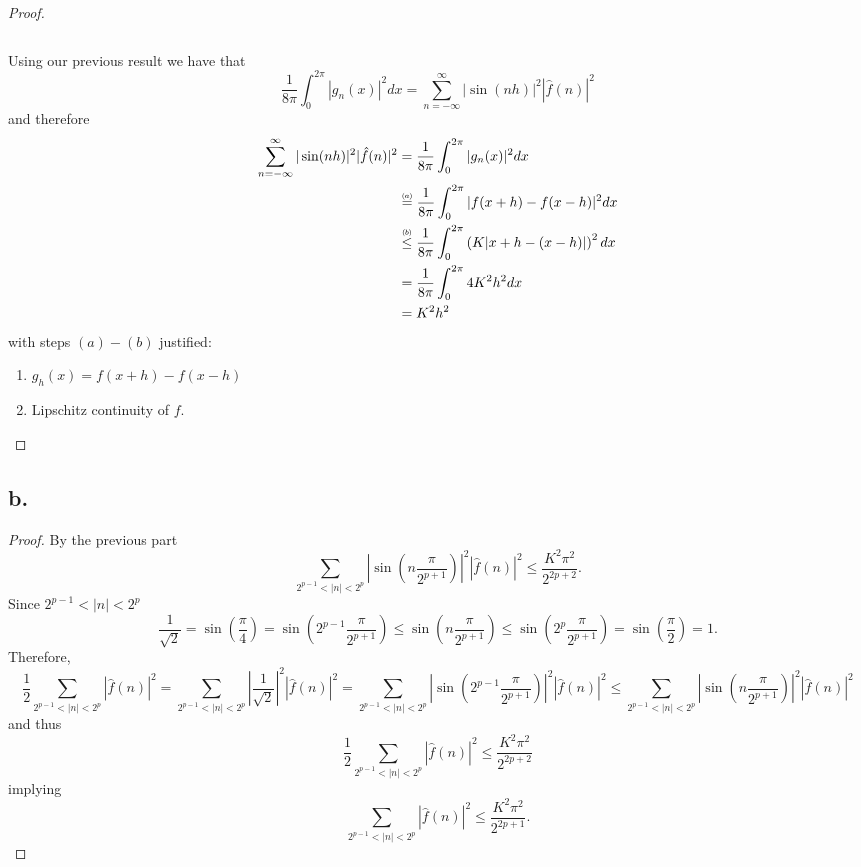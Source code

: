 \documentclass{article}
\newcommand\numeq[1]%
  {\stackrel{\scriptscriptstyle(\mkern-1.5mu#1\mkern-1.5mu)}{=}}
\newcommand\numleq[1]
  {\stackrel{\scriptscriptstyle(\mkern-1.5mu#1\mkern-1.5mu)}{\leq}}
\begin{document}
\begin{proof}
\begin{enumerate}[\indent(a)]
\[   \]
\end{enumerate}
Using our previous result we have that 
\[
 \frac{1}{8\pi}\int_0^{2\pi}|g_n(x)|^2dx = \sum\limits_{n = -\infty}^{\infty}|\sin(nh)|^2|\hat{f}(n)|^2   
\]
and therefore
\begin{align*}
    \sum\limits_{n = -\infty}^{\infty}|\sin(nh)|^2|\hat{f}(n)|^2 &= \frac{1}{8\pi}\int_0^{2\pi}|g_n(x)|^2dx \\
    &\numeq{a} \frac{1}{8\pi}\int_0^{2\pi}|f(x + h) - f(x - h)|^2dx \\
    &\numleq{b}\frac{1}{8 \pi}\int_0^{2\pi}\left(K|x + h - (x -h)|\right)^2 dx \\
    &= \frac{1}{8 \pi}\int_0^{2 \pi} 4K^2h^2dx \\
    &= K^2h^2
\end{align*}
with steps $(a)-(b)$ justified: 
\begin{enumerate}[\indent(a)]
   \item $g_h(x) = f(x + h)- f(x -h)$
   \item Lipschitz continuity of $f$.  
\end{enumerate}
\end{proof}
\subsection*{b.}
\begin{proof}
    By the previous part
    \[
    \sum\limits_{2^{p-1} < |n| < 2^p} \left|\sin\left(n\frac{\pi}{2^{p + 1}}\right)\right|^2|\hat{f}(n)|^2 \leq  \frac{K^2\pi^2}{2^{2p + 2}}. 
    \]
    Since $2^{p-1} < |n| < 2^p$
    \[
    \frac{1}{\sqrt{2}} = \sin\left(\frac{\pi}{4}\right) = \sin\left(2^{p-1}\frac{\pi}{2^{p+1}}\right) \leq \sin\left(n \frac{\pi}{2^{p + 1}}\right) \leq \sin\left(2^p\frac{\pi}{2^{p + 1}}\right) = \sin\left(\frac{\pi}{2} \right) = 1.
    \]
    Therefore, 
    \[
    \frac{1}{2}\sum\limits_{2^{p - 1} < |n| < 2^p} |\hat{f}(n)|^2 = \sum\limits_{2^{p - 1} < |n| < 2^p} \left|\frac{1}{\sqrt{2}}\right|^2|\hat{f}(n)|^2 = \sum\limits_{2^{p - 1} < |n| < 2^p} \left|\sin\left(2^{p - 1} \frac{\pi}{2^{p + 1}}\right)\right|^2 |\hat{f}(n)|^2 \leq \sum\limits_{2^{p - 1} < |n| < 2^p}\left|\sin\left(n\frac{\pi}{2^{p + 1}}\right)\right|^2|\hat{f}(n)|^2
    \]
    and thus \[
        \frac{1}{2}\sum\limits_{2^{p - 1} < |n| < 2^p} |\hat{f}(n)|^2   \leq  \frac{K^2\pi^2}{2^{2p + 2}}    
    \]
    implying 
    \[
        \sum\limits_{2^{p - 1} < |n| < 2^p} |\hat{f}(n)|^2 \leq \frac{K^2\pi^2}{2^{2p + 1}}.
    \]
\end{proof}
\end{document}
